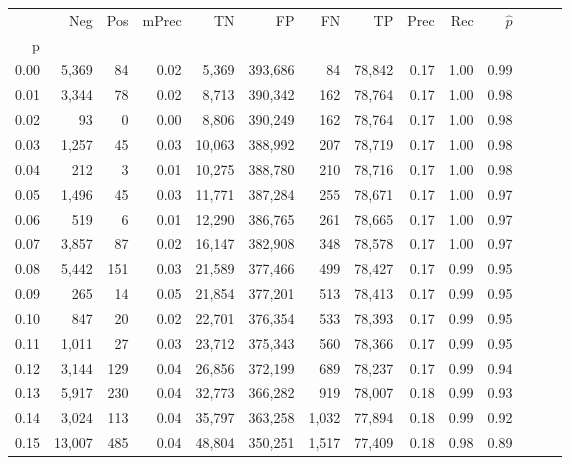 \begin{tabular}{rrrrrrrrrrrrrr}
\toprule
{} &     Neg &    Pos & mPrec &       TN &       FP &      FN &      TP &  Prec &   Rec & $\hat{p}$ \\
p    &         &        &       &          &          &         &         &       &       &           \\
\midrule
0.00 &   5,369 &     84 &  0.02 &    5,369 &  393,686 &      84 &  78,842 &  0.17 &  1.00 &      0.99 \\
0.01 &   3,344 &     78 &  0.02 &    8,713 &  390,342 &     162 &  78,764 &  0.17 &  1.00 &      0.98 \\
0.02 &      93 &      0 &  0.00 &    8,806 &  390,249 &     162 &  78,764 &  0.17 &  1.00 &      0.98 \\
0.03 &   1,257 &     45 &  0.03 &   10,063 &  388,992 &     207 &  78,719 &  0.17 &  1.00 &      0.98 \\
0.04 &     212 &      3 &  0.01 &   10,275 &  388,780 &     210 &  78,716 &  0.17 &  1.00 &      0.98 \\
0.05 &   1,496 &     45 &  0.03 &   11,771 &  387,284 &     255 &  78,671 &  0.17 &  1.00 &      0.97 \\
0.06 &     519 &      6 &  0.01 &   12,290 &  386,765 &     261 &  78,665 &  0.17 &  1.00 &      0.97 \\
0.07 &   3,857 &     87 &  0.02 &   16,147 &  382,908 &     348 &  78,578 &  0.17 &  1.00 &      0.97 \\
0.08 &   5,442 &    151 &  0.03 &   21,589 &  377,466 &     499 &  78,427 &  0.17 &  0.99 &      0.95 \\
0.09 &     265 &     14 &  0.05 &   21,854 &  377,201 &     513 &  78,413 &  0.17 &  0.99 &      0.95 \\
0.10 &     847 &     20 &  0.02 &   22,701 &  376,354 &     533 &  78,393 &  0.17 &  0.99 &      0.95 \\
0.11 &   1,011 &     27 &  0.03 &   23,712 &  375,343 &     560 &  78,366 &  0.17 &  0.99 &      0.95 \\
0.12 &   3,144 &    129 &  0.04 &   26,856 &  372,199 &     689 &  78,237 &  0.17 &  0.99 &      0.94 \\
0.13 &   5,917 &    230 &  0.04 &   32,773 &  366,282 &     919 &  78,007 &  0.18 &  0.99 &      0.93 \\
0.14 &   3,024 &    113 &  0.04 &   35,797 &  363,258 &   1,032 &  77,894 &  0.18 &  0.99 &      0.92 \\
0.15 &  13,007 &    485 &  0.04 &   48,804 &  350,251 &   1,517 &  77,409 &  0.18 &  0.98 &      0.89 \\

\end{tabular}
